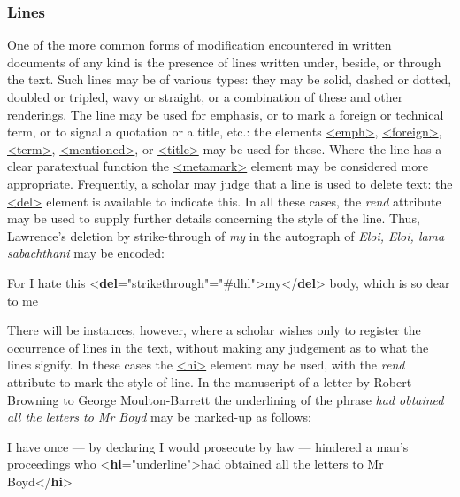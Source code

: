 \subsubsection[{Lines}]{Lines}\label{PHLN}\par
One of the more common forms of modification encountered in written documents of any kind is the presence of lines written under, beside, or through the text. Such lines may be of various types: they may be solid, dashed or dotted, doubled or tripled, wavy or straight, or a combination of these and other renderings. The line may be used for emphasis, or to mark a foreign or technical term, or to signal a quotation or a title, etc.: the elements \hyperref[TEI.emph]{<emph>}, \hyperref[TEI.foreign]{<foreign>}, \hyperref[TEI.term]{<term>}, \hyperref[TEI.mentioned]{<mentioned>}, or \hyperref[TEI.title]{<title>} may be used for these. Where the line has a clear paratextual function the \hyperref[TEI.metamark]{<metamark>} element may be considered more appropriate. Frequently, a scholar may judge that a line is used to delete text: the \hyperref[TEI.del]{<del>} element is available to indicate this. In all these cases, the {\itshape rend} attribute may be used to supply further details concerning the style of the line. Thus, Lawrence's deletion by strike-through of \textit{my} in the autograph of \textit{Eloi, Eloi, lama sabachthani} may be encoded: \par\bgroup{}\exampleFont \begin{shaded}\noindent\mbox{}For I hate this {<\textbf{del}\hspace*{1em}{rend}="{strikethrough}"\hspace*{1em}{hand}="{\#dhl}">}my{</\textbf{del}>} body, which is so\mbox{}\newline 
 dear to me\end{shaded}\egroup\par \par
There will be instances, however, where a scholar wishes only to register the occurrence of lines in the text, without making any judgement as to what the lines signify. In these cases the \hyperref[TEI.hi]{<hi>} element may be used, with the {\itshape rend} attribute to mark the style of line. In the manuscript of a letter by Robert Browning to George Moulton-Barrett the underlining of the phrase \textit{had obtained all the letters to Mr Boyd} may be marked-up as follows: \par\bgroup{}\exampleFont \begin{shaded}\noindent\mbox{}I have once — by\mbox{}\newline 
 declaring I would prosecute by law — hindered a man's proceedings who {<\textbf{hi}\hspace*{1em}{rend}="{underline}">}had obtained all the letters to Mr Boyd{</\textbf{hi}>}\end{shaded}\egroup\par \par
